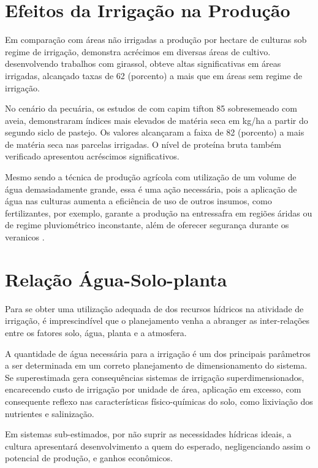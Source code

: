 \section{Efeitos da Irrigação na Produção}

Em comparação com áreas não irrigadas a produção por hectare de culturas sob regime de irrigação, demonstra acrécimos em diversas áreas de cultivo. \cite{sanches2013girassol} desenvolvendo trabalhos com girassol, obteve altas significativas em áreas irrigadas, alcançado taxas de 62 (porcento) a mais que em áreas sem regime de irrigação. 

No cenário da pecuária, os estudos de \cite{sanches2013tifton} com capim tifton 85   sobresemeado com aveia, demonstraram índices mais elevados de matéria seca em kg/ha a partir do segundo siclo de pastejo. Os valores alcançaram a faixa de 82 (porcento) a mais de matéria seca nas parcelas irrigadas. O nível de proteína bruta também verificado apresentou acréscimos significativos.

Mesmo sendo a técnica de produção agrícola com utilização de um volume de água demasiadamente grande, essa é uma ação necessária, pois a aplicação de água nas culturas aumenta a eficiência de uso de outros insumos, como fertilizantes, por exemplo, garante a produção na entressafra em regiões áridas ou de regime pluviométrico inconstante, além de oferecer segurança durante os veranicos \cite{de2008desenvolvimento}.

\section{Relação Água-Solo-planta}

Para se obter uma utilização adequada de dos recursos hídricos na atividade de irrigação, é imprescindível que o planejamento venha a abranger as inter-relações entre os fatores solo, água, planta e a atmosfera.

A quantidade de água necessária para a irrigação é um dos principais parâmetros a ser determinada em um correto planejamento de dimensionamento do sistema. Se superestimada gera consequências sistemas de irrigação superdimensionados, encarecendo custo de irrigação por unidade de área, aplicação em excesso, com consequente reflexo nas características físico-químicas do solo, como lixiviação dos nutrientes e salinização.

Em sistemas sub-estimados, por não suprir as necessidades hídricas ideais, a cultura apresentará desenvolvimento a quem do esperado, negligenciando assim o potencial de produção, e ganhos econômicos.

